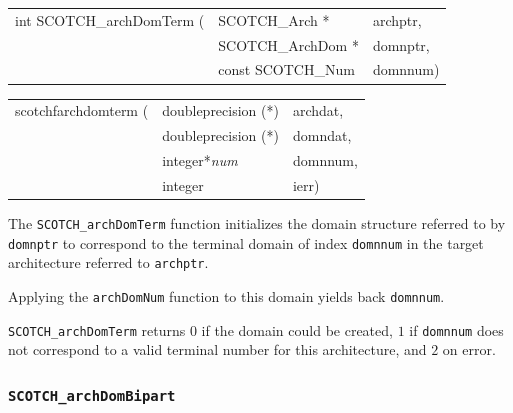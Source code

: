\begin{itemize}
\progsyn

{\tt\begin{tabular}{l@{}ll}
int SCOTCH\_archDomTerm ( & SCOTCH\_Arch *    & archptr, \\
                          & SCOTCH\_ArchDom * & domnptr, \\
                          & const SCOTCH\_Num & domnnum) \\
\end{tabular}}

{\tt\begin{tabular}{l@{}ll}
scotchfarchdomterm ( & doubleprecision (*) & archdat, \\
                     & doubleprecision (*) & domndat, \\
                     & integer*{\it num}   & domnnum, \\
                     & integer             & ierr)
\end{tabular}}

\progdes

The {\tt SCOTCH\_archDomTerm} function initializes the domain
structure referred to by {\tt domnptr} to correspond to the
terminal domain of index {\tt domnnum} in the target architecture
referred to {\tt archptr}.

Applying the {\tt arch\lbt Dom\lbt Num} function to this domain
yields back {\tt domnnum}.

\progret

{\tt SCOTCH\_archDomTerm} returns $0$ if the domain could be created,
$1$ if {\tt domnnum} does not correspond to a valid terminal number
for this architecture, and $2$ on error.
\end{itemize}

\subsubsection{{\tt SCOTCH\_archDomBipart}}

